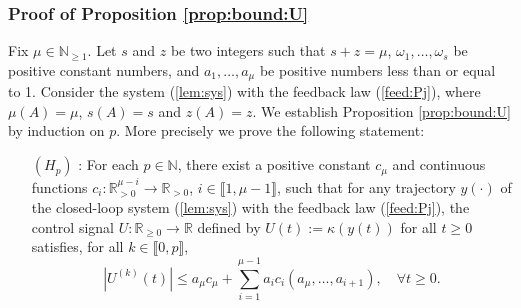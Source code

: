 \documentclass[letterpaper, 10pt]{article}
\newcommand{\rref}[1]{(\ref{#1})}
\newcommand{\abs}[1]{\left| #1 \right|}
\newcommand{\reels}{\mathbb{R}}
\newcommand{\entiers}{\mathbb{N}}
\begin{document}
\subsubsection{Proof of Proposition \ref{prop:bound:U}}\label{sec:proofprop2}
Fix $\mu \in \entiers_{\geq 1}$. Let $s$ and $z$ be two integers such that $s + z = \mu $, $\omega_1, \ldots , \omega_s$ be positive constant numbers, and $a_1, \ldots , a_\mu $ be positive numbers less than or equal to 1. Consider the system \rref{lem:sys} with the feedback law \rref{feed:Pj}, where $\mu(A) = \mu$, $s(A) =s$ and $z(A)=z$. We establish Proposition \ref{prop:bound:U} by induction on $p$. More precisely we prove the following statement:
\begin{itemize}
\item[$(H_p)$ :] For each $p \in \entiers$, there exist a positive constant $c_\mu$ and continuous functions $c_i : \reels^{\mu -i}_{>0 } \to \reels_{>0} $, $i \in \llbracket 1 , \mu -1 \rrbracket$, such that for any trajectory $y(\cdot)$ of the closed-loop system \rref{lem:sys} with the feedback law \rref{feed:Pj}, the control signal $U : \reels_{\geq 0} \rightarrow  \reels $ defined by $U(t) := \kappa (y(t)) $ for all $t \geq 0$ satisfies, for all $k \in \llbracket 0 ,p \rrbracket $,
\begin{equation*}
\abs{U^{(k)}(t)} \leq a_\mu c_{\mu}+ \sum\limits_{i=1}^{ \mu - 1 } a_i c_i( a_{\mu} , \ldots , a_{i+1} ), \quad \forall t \geq 0. 
\end{equation*}
\end{itemize}
\end{document}
